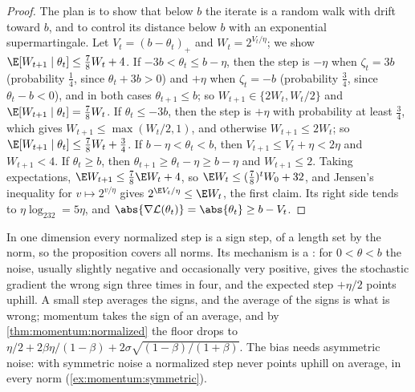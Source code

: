 \begin{refsection}

\begin{proof}
The plan is to show that below $b$ the iterate is a random walk with drift toward $b$, and to control its distance below $b$ with an exponential supermartingale. Let $V_t=(b-\theta_t)_+$ and $W_t=2^{V_t/\eta}$; we show $\E[W_{t+1}\mid\theta_t]\le\frac78W_t+4$. If $-3b<\theta_t\le b-\eta$, then the step is $-\eta$ when $\zeta_t=3b$ (probability $\frac14$, since $\theta_t+3b>0$) and $+\eta$ when $\zeta_t=-b$ (probability $\frac34$, since $\theta_t-b<0$), and in both cases $\theta_{t+1}\le b$; so $W_{t+1}\in\{2W_t,W_t/2\}$ and $\E[W_{t+1}\mid\theta_t]=\frac78W_t$. If $\theta_t\le-3b$, then the step is $+\eta$ with probability at least $\frac34$, which gives $W_{t+1}\le\max(W_t/2,1)$, and otherwise $W_{t+1}\le2W_t$; so $\E[W_{t+1}\mid\theta_t]\le\frac78W_t+\frac34$. If $b-\eta<\theta_t<b$, then $V_{t+1}\le V_t+\eta<2\eta$ and $W_{t+1}<4$. If $\theta_t\ge b$, then $\theta_{t+1}\ge\theta_t-\eta\ge b-\eta$ and $W_{t+1}\le2$. Taking expectations, $\E W_{t+1}\le\frac78\E W_t+4$, so $\E W_t\le(\frac78)^tW_0+32$, and Jensen's inequality for $v\mapsto2^{v/\eta}$ gives $2^{\E V_t/\eta}\le\E W_t$, the first claim. Its right side tends to $\eta\log_232=5\eta$, and $\abs{\nabla\Loss(\theta_t)}=\abs{\theta_t}\ge b-V_t$.
\end{proof}

In one dimension every normalized step is a sign step, of a length set by the norm, so the proposition covers all norms. Its mechanism is a : for $0<\theta<b$ the noise, usually slightly negative and occasionally very positive, gives the stochastic gradient the wrong sign three times in four, and the expected step $+\eta/2$ points uphill. A small step averages the signs, and the average of the signs is what is wrong; momentum takes the sign of an average, and by \cref{thm:momentum:normalized} the floor drops to $\eta/2+2\beta\eta/(1-\beta)+2\sigma\sqrt{(1-\beta)/(1+\beta)}$. The bias needs asymmetric noise: with symmetric noise a normalized step never points uphill on average, in every norm (\cref{ex:momentum:symmetric}).


\end{refsection}
